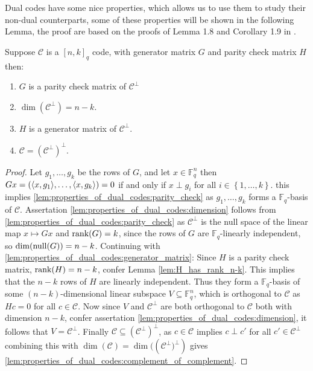 Dual codes have some nice properties, which allows us to use them to study their non-dual counterparts, some of these properties will be shown in the following Lemma, the proof are based on the proofs of Lemma 1.8 and Corollary 1.9 in \cite{notes_on_alg_geom_codes}.
\begin{lemma}\label{lem:properties_of_dual_codes}
  Suppose $\mathcal{C}$ is a $[n, k]_{q}$ code, with generator matrix $G$ and parity check matrix $H$ then:
  \begin{enumerate}
    \item $G$ is a parity check matrix of $\mathcal{C}^{\perp}$ \label{lem:properties_of_dual_codes:parity_check}
    \item $\dim(\mathcal{C}^{\perp}) = n - k$. \label{lem:properties_of_dual_codes:dimension}
    \item $H$ is a generator matrix of $\mathcal{C}^{\perp}$. \label{lem:properties_of_dual_codes:generator_matrix}
    \item $\mathcal{C} = (\mathcal{C}^{\perp})^{\perp}$. \label{lem:properties_of_dual_codes:complement_of_complement}
  \end{enumerate}
\end{lemma}
\begin{proof}
  Let $g_1, \ldots, g_{k}$ be the rows of $G$, and let $x \in \mathbb{F}_q^n$ then $G x = (\langle x, g_{1}\rangle, \ldots,  \langle x, g_{k}\rangle) = 0$ if and only if $x \perp g_{i}$ for all $i \in \left\{1, \ldots, k\right\}$.
  this implies \ref{lem:properties_of_dual_codes:parity_check} as $g_{1}, \ldots, g_{k}$ forms a $\mathbb{F}_{q}$-basis of $\mathcal{C}$.
  Assertation \ref{lem:properties_of_dual_codes:dimension} follows from  \ref{lem:properties_of_dual_codes:parity_check} as $\mathcal{C}^{\perp}$ is the null space of the linear map $x \mapsto Gx$ and $\textnormal{rank}(G) = k$, since the rows of $G$ are $\mathbb{F}_q$-linearly independent, so $\dim(\textnormal{null}(G)) = n - k$.
  Continuing with \ref{lem:properties_of_dual_codes:generator_matrix}: Since $H$ is a parity check matrix, $\textnormal{rank}(H) = n - k$, confer Lemma \ref{lem:H_has_rank_n-k}. This implies that the $n -k$ rows of $H$ are linearly independent. Thus they form a $\mathbb{F}_q$-basis of some $(n-k)$-dimensional linear subspace $V \subseteq \mathbb{F}_q^{n}$, which is orthogonal to $\mathcal{C}$ as $Hc = 0$ for all $c \in \mathcal{C}$. Now since $V$ and $\mathcal{C}^{\perp}$ are both orthogonal to $\mathcal{C}$ both with dimension $n - k$, confer assertation \ref{lem:properties_of_dual_codes:dimension}, it follows that $V  = \mathcal{C}^{\perp}$.
  Finally $\mathcal{C} \subseteq (\mathcal{C}^{\perp})^{\perp}$, as $c \in \mathcal{C}$ implies $c \perp c'$ for all $c' \in \mathcal{C}^{\perp}$ combining this with $\dim(\mathcal{C}) = \dim(\left(\mathcal{C}^{\perp})^{\perp}\right)$ gives \ref{lem:properties_of_dual_codes:complement_of_complement}.
\end{proof}

